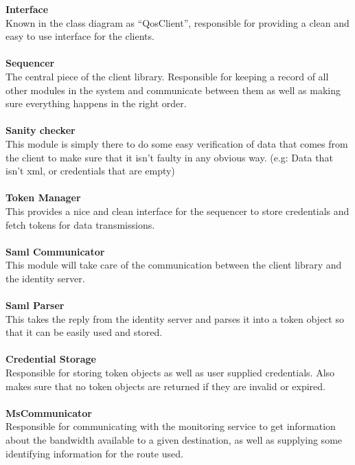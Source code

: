 		\textbf{Interface} \\
Known in the class diagram as “QosClient”, responsible for providing a clean and easy to use interface for the clients.
\\\\
		\textbf{Sequencer} \\
The central piece of the client library. Responsible for keeping a record of all other modules in the system and communicate between them as well as making sure everything happens in the right order.
\\\\
		\textbf{Sanity checker} \\
This module is simply there to do some easy verification of data that comes from the client to make sure that it isn’t faulty in any obvious way. (e.g: Data that isn’t xml, or credentials that are empty)
\\\\
		\textbf{Token Manager} \\
This provides a nice and clean interface for the sequencer to store credentials and fetch tokens for data transmissions.
\\\\
		\textbf{Saml Communicator} \\
This module will take care of the communication between the client library and the identity server.
\\\\
		\textbf{Saml Parser} \\
This takes the reply from the identity server and parses it into a token object so that it can be easily used and stored.
\\\\
		\textbf{Credential Storage} \\
Responsible for storing token objects as well as user supplied credentials. Also makes sure that no token objects are returned if they are invalid or expired.
\\\\
		\textbf{MsCommunicator} \\
Responsible for communicating with the monitoring service to get information about the bandwidth available to a given destination, as well as supplying some identifying information for the route used.

